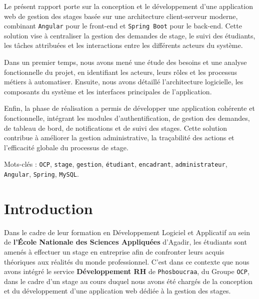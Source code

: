 \documentclass[14pt,a4paper]{article}
\begin{document}
Le présent rapport porte sur la conception et le développement d'une application web de gestion des stages basée sur une architecture client-serveur moderne, combinant \texttt{Angular} pour le front-end et \texttt{Spring Boot} pour le back-end. Cette solution vise à centraliser la gestion des demandes de stage, le suivi des étudiants, les tâches attribuées et les interactions entre les différents acteurs du système.

Dans un premier temps, nous avons mené une étude des besoins et une analyse fonctionnelle du projet, en identifiant les acteurs, leurs rôles et les processus métiers à automatiser. Ensuite, nous avons détaillé l'architecture logicielle, les composants du système et les interfaces principales de l'application.

Enfin, la phase de réalisation a permis de développer une application cohérente et fonctionnelle, intégrant les modules d'authentification, de gestion des demandes, de tableau de bord, de notifications et de suivi des stages. Cette solution contribue à améliorer la gestion administrative, la traçabilité des actions et l'efficacité globale du processus de stage.

Mots-clés : \texttt{OCP}, \texttt{stage}, \texttt{gestion}, \texttt{étudiant}, \texttt{encadrant}, \texttt{administrateur}, \texttt{Angular}, \texttt{Spring}, \texttt{MySQL}.
\newpage
\tableofcontents
\newpage
\section*{Introduction}

Dans le cadre de leur formation en Développement Logiciel et Applicatif au sein de \textbf{l'École Nationale des Sciences Appliquées} d'Agadir, les étudiants sont amenés à effectuer un stage en entreprise afin de confronter leurs acquis théoriques aux réalités du monde professionnel. C'est dans ce contexte que nous avons intégré le service \textbf{Développement RH} de \texttt{\large Phosboucraa}, du Groupe \texttt{\large OCP}, dans le cadre d'un stage au cours duquel nous avons été chargés de la conception et du développement d'une application web dédiée à la gestion des stages.
\end{document}

